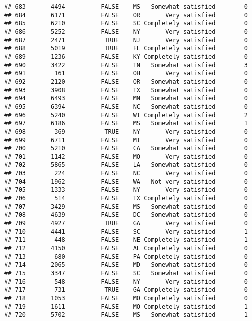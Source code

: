 \documentclass[]{book}
\theoremstyle{definition}
\theoremstyle{definition}
\theoremstyle{remark}
\begin{document}
\begin{verbatim}
## 683       4494          FALSE    MS   Somewhat satisfied        0
## 684       6171          FALSE    OR       Very satisfied        0
## 685       6210          FALSE    SC Completely satisfied        0
## 686       5252          FALSE    NY       Very satisfied        0
## 687       2471           TRUE    NJ       Very satisfied        0
## 688       5019           TRUE    FL Completely satisfied        0
## 689       1236          FALSE    KY Completely satisfied        0
## 690       3422          FALSE    TN   Somewhat satisfied        3
## 691        161          FALSE    OH       Very satisfied        0
## 692       2120          FALSE    OR   Somewhat satisfied        0
## 693       3908          FALSE    TX   Somewhat satisfied        0
## 694       6493          FALSE    MN   Somewhat satisfied        0
## 695       6394          FALSE    NC   Somewhat satisfied        0
## 696       5240          FALSE    WI Completely satisfied        2
## 697       6186          FALSE    MS   Somewhat satisfied        1
## 698        369           TRUE    NY       Very satisfied        0
## 699       6711          FALSE    MI       Very satisfied        0
## 700       5210          FALSE    CA   Somewhat satisfied        0
## 701       1142          FALSE    MO       Very satisfied        0
## 702       5865          FALSE    LA   Somewhat satisfied        0
## 703        224          FALSE    NC       Very satisfied        0
## 704       1962          FALSE    WA   Not very satisfied        0
## 705       1333          FALSE    NY       Very satisfied        0
## 706        514          FALSE    TX Completely satisfied        0
## 707       3429          FALSE    MS   Somewhat satisfied        0
## 708       4639          FALSE    DC   Somewhat satisfied        0
## 709       4927           TRUE    GA       Very satisfied        0
## 710       4441          FALSE    SC       Very satisfied        1
## 711        448          FALSE    NE Completely satisfied        1
## 712       4150          FALSE    AL Completely satisfied        0
## 713        680          FALSE    PA Completely satisfied        0
## 714       2065          FALSE    MD   Somewhat satisfied        0
## 715       3347          FALSE    SC   Somewhat satisfied        0
## 716        548          FALSE    NY       Very satisfied        0
## 717        731           TRUE    GA Completely satisfied        0
## 718       1053          FALSE    MO Completely satisfied        0
## 719       1611          FALSE    MO Completely satisfied        1
## 720       5702          FALSE    MS   Somewhat satisfied        1

\end{verbatim}
\end{document}
